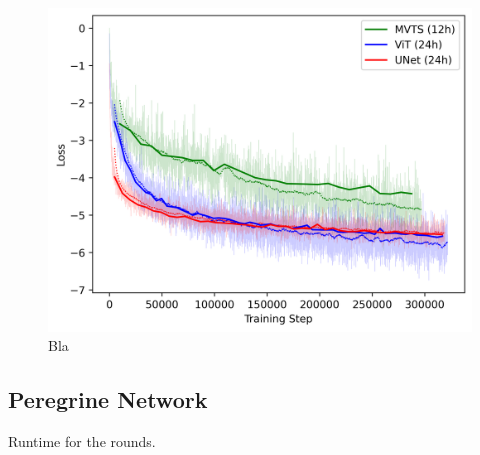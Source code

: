 \begin{figure}
  \centering
  \includegraphics[width=1\linewidth]{media/images/Pretraining_loss_curve.png}
  \caption{Bla}
  \label{fig:pretain_loss_curve}
\end{figure}

\subsection{Peregrine Network}

Runtime for the rounds.

